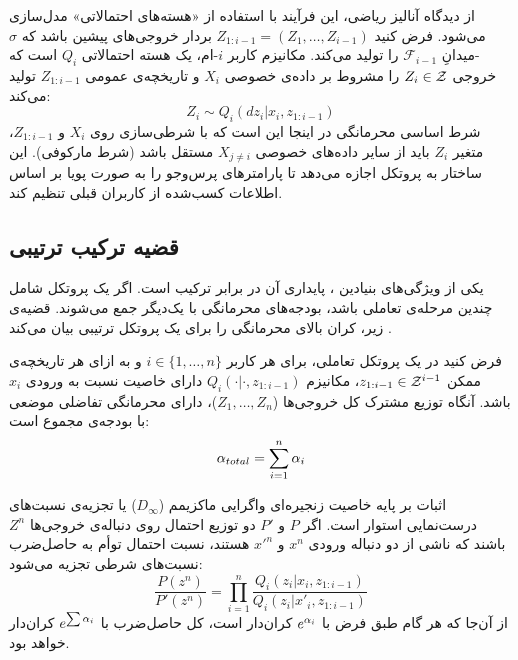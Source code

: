 از دیدگاه آنالیز ریاضی، این فرآیند با استفاده از «هسته‌های احتمالاتی» مدل‌سازی می‌شود. فرض کنید $Z_{1:i-1} = (Z_1, \dots, Z_{i-1})$ بردار خروجی‌های پیشین باشد که $\sigma$-میدانِ $\mathcal{F}_{i-1}$ را تولید می‌کند. مکانیزم کاربر $i$-ام، یک هسته احتمالاتی $Q_i$ است که خروجی $Z_i \in \Zset$ را مشروط بر داده‌ی خصوصی $X_i$ و تاریخچه‌ی عمومی $Z_{1:i-1}$ تولید می‌کند:
\begin{equation}
Z_i \sim Q_i(dz_i | x_i, z_{1:i-1})
\end{equation}
شرط اساسی محرمانگی در اینجا این است که با شرطی‌سازی روی $X_i$ و $Z_{1:i-1}$، متغیر $Z_i$ باید از سایر داده‌های خصوصی $X_{j \neq i}$ مستقل باشد (شرط مارکوفی). این ساختار به پروتکل اجازه می‌دهد تا پارامترهای پرس‌وجو را به صورت پویا بر اساس اطلاعات کسب‌شده از کاربران قبلی تنظیم کند.

\subsection{قضیه ترکیب ترتیبی}
یکی از ویژگی‌های بنیادین ، پایداری آن در برابر ترکیب است. اگر یک پروتکل شامل چندین مرحله‌ی تعاملی باشد، بودجه‌های محرمانگی با یک‌دیگر جمع می‌شوند. قضیه‌ی زیر، کران بالای محرمانگی را برای یک پروتکل ترتیبی بیان می‌کند \cite{Duchi2013}.

\begin{قضیه}
\label{thm:ldp-composition}
فرض کنید در یک پروتکل تعاملی، برای هر کاربر $i \in \{1, \dots, n\}$ و به ازای هر تاریخچه‌ی ممکن $z_{1:i-1} \in \Zset^{i-1}$، مکانیزم $Q_i(\cdot | \cdot, z_{1:i-1})$ دارای خاصیت \LDP[\al_i] نسبت به ورودی $x_i$ باشد. آنگاه توزیع مشترک کل خروجی‌ها ($Z_1, \dots, Z_n$)، دارای محرمانگی تفاضلی موضعی با بودجه‌ی مجموع است:
\begin{equation}
\alpha_{total} = \sum_{i=1}^n \alpha_i
\end{equation}
\end{قضیه}

\begin{اثبات}
اثبات بر پایه خاصیت زنجیره‌ای واگرایی ماکزیمم ($D_\infty$) یا تجزیه‌ی نسبت‌های درست‌نمایی استوار است. اگر $P$ و $P'$ دو توزیع احتمال روی دنباله‌ی خروجی‌ها $Z^n$ باشند که ناشی از دو دنباله ورودی $x^n$ و ${x'}^n$ هستند، نسبت احتمال توأم به حاصل‌ضرب نسبت‌های شرطی تجزیه می‌شود:
\[
\frac{P(z^n)}{P'(z^n)} = \prod_{i=1}^n \frac{Q_i(z_i | x_i, z_{1:i-1})}{Q_i(z_i | x'_i, z_{1:i-1})}
\]
از آن‌جا که هر گام طبق فرض با $e^{\alpha_i}$ کران‌دار است، کل حاصل‌ضرب با $e^{\sum \alpha_i}$ کران‌دار خواهد بود.
\end{اثبات}


